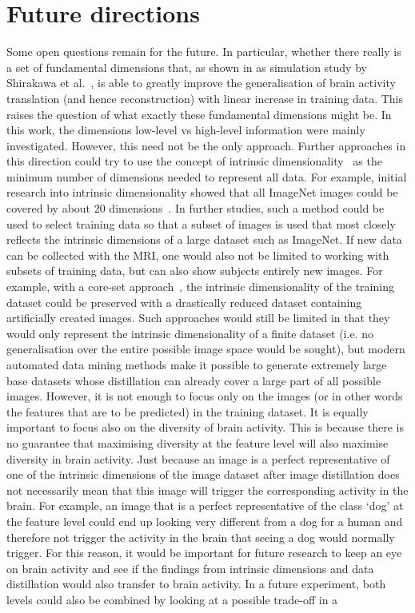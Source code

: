 \section{Future directions}

Some open questions remain for the future. In particular, whether there really is a set of fundamental dimensions that, as shown in as simulation study by Shirakawa et al.~\cite{shirakawaSpuriousReconstructionBrain2024}, is able to greatly improve the generalisation of brain activity translation (and hence reconstruction) with linear increase in training data. This raises the question of what exactly these fundamental dimensions might be. In this work, the dimensions low-level vs high-level information were mainly investigated. However, this need not be the only approach. Further approaches in this direction could try to use the concept of intrinsic dimensionality~\cite{bennettIntrinsicDimensionalitySignal1969} as the minimum number of dimensions needed to represent all data. For example, initial research into intrinsic dimensionality showed that all ImageNet images could be covered by about 20 dimensions~\cite{popeIntrinsicDimensionImages2021}. In further studies, such a method could be used to select training data so that a subset of images is used that most closely reflects the intrinsic dimensions of a large dataset such as ImageNet. If new data can be collected with the MRI, one would also not be limited to working with subsets of training data, but can also show subjects entirely new images. For example, with a core-set approach~\cite{nguyenDatasetDistillationInfinitely2021,wangDatasetDistillation2018}, the intrinsic dimensionality of the training dataset could be preserved with a drastically reduced dataset containing artificially created images. Such approaches would still be limited in that they would only represent the intrinsic dimensionality of a finite dataset (i.e. no generalisation over the entire possible image space would be sought), but modern automated data mining methods make it possible to generate extremely large base datasets whose distillation can already cover a large part of all possible images. However, it is not enough to focus only on the images (or in other words the features that are to be predicted) in the training dataset. It is equally important to focus also on the diversity of brain activity. This is because there is no guarantee that maximising diversity at the feature level will also maximise diversity in brain activity. Just because an image is a perfect representative of one of the intrinsic dimensions of the image dataset after image distillation does not necessarily mean that this image will trigger the corresponding activity in the brain. For example, an image that is a perfect representative of the class `dog' at the feature level could end up looking very different from a dog for a human and therefore not trigger the activity in the brain that seeing a dog would normally trigger. For this reason, it would be important for future research to keep an eye on brain activity and see if the findings from intrinsic dimensions and data distillation would also transfer to brain activity. In a future experiment, both levels could also be combined by looking at  a possible trade-off in a 